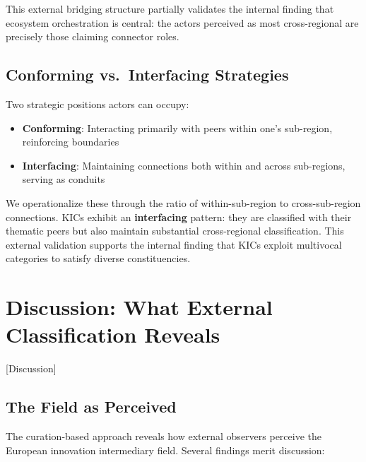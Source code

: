 \documentclass[../main.tex]{subfiles}
\begin{document}
This external bridging structure partially validates the internal finding that ecosystem orchestration is central: the actors perceived as most cross-regional are precisely those claiming connector roles.


\subsection{Conforming vs.\ Interfacing Strategies}

Two strategic positions actors can occupy:

\begin{itemize}
    \item \textbf{Conforming}: Interacting primarily with peers within one's sub-region, reinforcing boundaries
    \item \textbf{Interfacing}: Maintaining connections both within and across sub-regions, serving as conduits
\end{itemize}

We operationalize these through the ratio of within-sub-region to cross-sub-region connections. KICs exhibit an \textbf{interfacing} pattern: they are classified with their thematic peers but also maintain substantial cross-regional classification. This external validation supports the internal finding that KICs exploit multivocal categories to satisfy diverse constituencies.


\section{Discussion: What External Classification Reveals}[Discussion]

\subsection{The Field as Perceived}

The curation-based approach reveals how external observers perceive the European innovation intermediary field. Several findings merit discussion:
\end{document}

